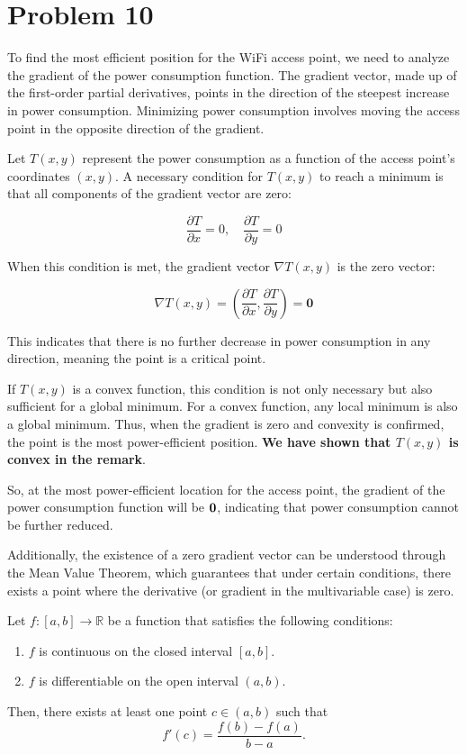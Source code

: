 \documentclass[12pt,a4paper]{article}
\begin{document}
\section*{Problem 10}
\begin{solution}
To find the most efficient position for the WiFi access point, we need to analyze the gradient of the power consumption function. The gradient vector, made up of the first-order partial derivatives, points in the direction of the steepest increase in power consumption. Minimizing power consumption involves moving the access point in the opposite direction of the gradient.

Let \( T(x, y) \) represent the power consumption as a function of the access point’s coordinates \((x, y)\). A necessary condition for \( T(x, y) \) to reach a minimum is that all components of the gradient vector are zero:

\[
\frac{\partial T}{\partial x} = 0, \quad \frac{\partial T}{\partial y} = 0
\]

When this condition is met, the gradient vector \( \nabla T(x, y) \) is the zero vector:

\[
\nabla T(x, y) = \left( \frac{\partial T}{\partial x}, \frac{\partial T}{\partial y} \right) = \mathbf{0}
\]

This indicates that there is no further decrease in power consumption in any direction, meaning the point is a critical point.

If \( T(x, y) \) is a convex function, this condition is not only necessary but also sufficient for a global minimum. For a convex function, any local minimum is also a global minimum. Thus, when the gradient is zero and convexity is confirmed, the point is the most power-efficient position. \textbf{We have shown that $T(x,y)$ is convex in the remark}.

So, at the most power-efficient location for the access point, the gradient of the power consumption function will be $\mathbf{0}$, indicating that power consumption cannot be further reduced.


Additionally, the existence of a zero gradient vector can be understood through the Mean Value Theorem, which guarantees that under certain conditions, there exists a point where the derivative (or gradient in the multivariable case) is zero\cite{rudin_principles_1976}.

\begin{theorem}
    Let \( f: [a, b] \rightarrow \mathbb{R} \) be a function that satisfies the following conditions:
\begin{enumerate}
    \item \( f \) is continuous on the closed interval \([a, b]\).
    \item \( f \) is differentiable on the open interval \((a, b)\).
\end{enumerate}
Then, there exists at least one point \( c \in (a, b) \) such that
\[
f'(c) = \frac{f(b) - f(a)}{b - a}.
\]
\end{theorem}


\end{solution}
\end{document}
